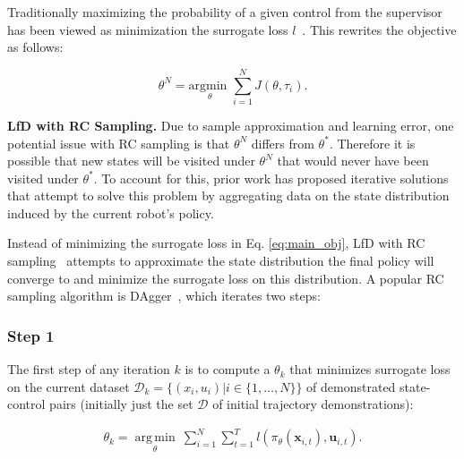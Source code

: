 \documentclass[10pt, conference]{ieeeconf}      %
\DeclareMathOperator*{\argmin}{arg\,min}
\newcommand{\bu}{\mathbf{u}}
\newcommand{\bx}{\mathbf{x}}
\newcommand{\nc}{RC }
\begin{document}
Traditionally maximizing the probability of a given control from the supervisor has been viewed as minimization the surrogate loss $l$~\cite{ross2010reduction,ross2010efficient}.
This rewrites the objective as follows: 

\begin{equation}\label{eq:main_obj}
\theta^N = \underset{\theta}{\mbox{argmin }} \sum \limits_{i=1}^N J(\theta, \tau_i).
\end{equation}

\noindent \textbf{LfD with \nc Sampling.}
Due to sample approximation and learning error, one potential issue with \nc sampling is that $\theta^N$ differs from $\theta^*$.
Therefore it is possible that new states will be visited under $\theta^N$ that would never have been visited under $\theta^*$.
To account for this, prior work has proposed iterative solutions~\cite{ross2010reduction} that attempt to solve this problem by aggregating data on the state distribution induced by the current robot's policy.

Instead of  minimizing the surrogate loss in Eq. \ref{eq:main_obj},  LfD with RC sampling~\cite{ross2010reduction,laskeyshiv,he2012imitation} attempts to approximate the state distribution the final policy will converge to and minimize the surrogate loss on this distribution.
A popular RC sampling algorithm is DAgger~\cite{ross2010reduction}, which iterates two steps:

\subsubsection{Step 1}
The first step of any iteration $k$ is to compute a $\theta_k$ that minimizes surrogate loss on the current dataset $\mathcal{D}_k=\{(x_i,u_i)|i\in\{1,\ldots,N\}\}$ of demonstrated state-control pairs (initially just the set $\mathcal{D}$ of initial trajectory demonstrations):

 \vspace{-1ex}
\begin{align}\label{eq:super_objj}
\theta_{k} = \underset{\theta}{\argmin} \: \sum_{i=1}^{N} \sum_{t=1}^T  l(\pi_{\theta}(\bx_{i,t}),\bu_{i,t}).
\end{align}
\end{document}
